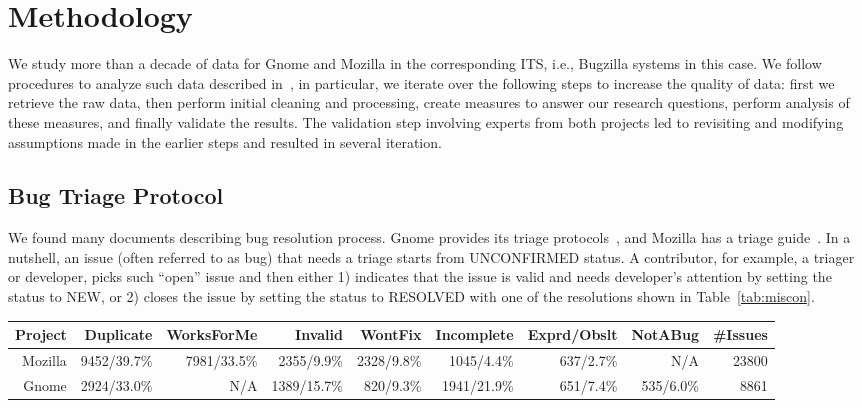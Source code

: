 \documentclass[conference]{IEEEtran}
\begin{document}
\section{Methodology}\label{s:method}
We study more than a decade of data for Gnome and Mozilla in the
corresponding ITS, i.e., Bugzilla systems in this case.  We follow
procedures to analyze such data described in~\cite{Changes07}, in
particular, we iterate over the following steps to increase the
quality of data: first we retrieve the raw data, then perform
initial cleaning and processing, create measures to answer our
research questions, perform analysis of these measures, and finally
validate the results. The validation step involving experts from
both projects led to revisiting and modifying assumptions made in
the earlier steps and resulted in several iteration.

\subsection{Bug Triage Protocol}\label{ss:protocol}
We found many documents describing bug resolution process. Gnome
provides its triage
protocols~\cite{gnsquard}, and
Mozilla has a triage
guide~\cite{mztriage}.  In a
nutshell, an issue (often referred to as bug) that needs a triage
starts from UNCONFIRMED status. A contributor, for example, a
triager or developer, picks such ``open'' issue and then either 1)
indicates that the issue is valid and needs developer's attention by
setting the status to NEW, or 2) closes the issue by setting the
status to RESOLVED with one of the resolutions shown in Table~\ref{tab:miscon}.

\begin{table*}[ht]
\centering
\caption{Misconfirmed Reports with Their Final Resolution}\label{tab:miscon}
\begin{tabular}{|r|r|r|r|r|r|r|r|r|}  \hline
  Project & Duplicate & WorksForMe & Invalid & WontFix & Incomplete
  & Exprd/Obslt & NotABug &\#Issues\\ %
  \hline
  Mozilla & 9452/39.7\% & 7981/33.5\% & 2355/9.9\% & 2328/9.8\% & 1045/4.4\% & 637/2.7\% &N/A& 23800\\ %
\hline
  Gnome & 2924/33.0\% & N/A & 1389/15.7\% & 820/9.3\% & 1941/21.9\% & 651/7.4\% & 535/6.0\% & 8861\\ %
\hline

\end{tabular}
\vspace{-0.1in}
\end{table*}
\end{document}
